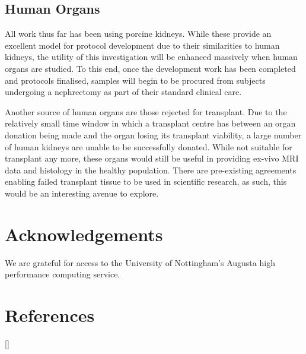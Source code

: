 \subsection{Human Organs}
All work thus far has been using porcine kidneys. While these provide an excellent model for protocol development due to their similarities to human kidneys, the utility of this investigation will be enhanced massively when human organs are studied. To this end, once the development work has been completed and protocols finalised, samples will begin to be procured from subjects undergoing a nephrectomy as part of their standard clinical care.

Another source of human organs are those rejected for transplant. Due to the relatively small time window in which a transplant centre has between an organ donation being made and the organ losing its transplant viability, a large number of human kidneys are unable to be successfully donated. While not suitable for transplant any more, these organs would still be useful in providing ex-vivo \ac{MRI} data and histology in the healthy population. There are pre-existing agreements enabling failed transplant tissue to be used in scientific research, as such, this would be an interesting avenue to explore.

\section{Acknowledgements}

We are grateful for access to the University of Nottingham's Augusta high performance computing service.

\newpage
\section{References}
[\refname]{}
\printbibliography